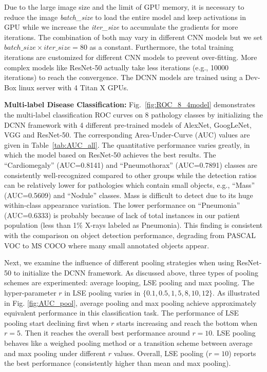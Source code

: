 \documentclass[10pt,twocolumn,letterpaper]{article}
\begin{document}
Due to the large image size and the limit of GPU memory, it is necessary to reduce the image \textit{batch\_size} to load the entire model and keep activations in GPU while we increase the \textit{iter\_size} to accumulate the gradients for more iterations. The combination of both may vary in different CNN models but we set $batch\_size\times iter\_size = 80$ as a constant. Furthermore, the total training iterations are customized for different CNN models to prevent over-fitting. More complex models like ResNet-50 actually take less iterations (e.g., 10000 iterations) to reach the convergence. The DCNN models are trained using a Dev-Box linux server with 4 Titan X GPUs.     

{\bf Multi-label Disease Classification:}
Fig.~\ref{fig:ROC_8_4model} demonstrates the multi-label classification ROC curves on 8 pathology classes by initializing the DCNN framework with 4 different pre-trained models of AlexNet, GoogLeNet, VGG and ResNet-50. The corresponding Area-Under-Curve (AUC) values are given in Table~\ref{tab:AUC_all}. The quantitative performance varies greatly, in which the model based on ResNet-50 achieves the best results. The ``Cardiomegaly'' (AUC=0.8141) and ``Pneumothorax'' (AUC=0.7891) classes are consistently well-recognized compared to other groups while the detection ratios can be relatively lower for pathologies which contain small objects, e.g., ``Mass'' (AUC=0.5609) and ``Nodule'' classes. Mass is difficult to detect due to its huge within-class appearance variation. The lower performance on ``Pneumonia'' (AUC=0.6333) is probably because of lack of total instances in our patient population (less than 1\% X-rays labeled as Pneumonia). This finding is consistent with the comparison on object detection performance, degrading from PASCAL VOC \cite{Everingham2015} to MS COCO \cite{Lin2014COCO} where many small annotated objects appear. 

Next, we examine the influence of different pooling strategies when using ResNet-50 to initialize the DCNN framework. As discussed above, three types of pooling schemes are experimented: average looping, LSE pooling and max pooling. The hyper-parameter $r$ in LSE pooling varies in $\{0.1,0.5,1,5,8,10,12\}$. As illustrated in Fig. \ref{fig:AUC_pool}, average pooling and max pooling achieve approximately equivalent performance in this classification task. The performance of LSE pooling start declining first when $r$ starts increasing and reach the bottom when $r=5$. Then it reaches the overall best performance around $r=10$. LSE pooling behaves like a weighed pooling method or a transition scheme between average and max pooling under different $r$ values. Overall, LSE pooling ($r=10$) reports the best performance (consistently higher than mean and max pooling). 
\end{document}
